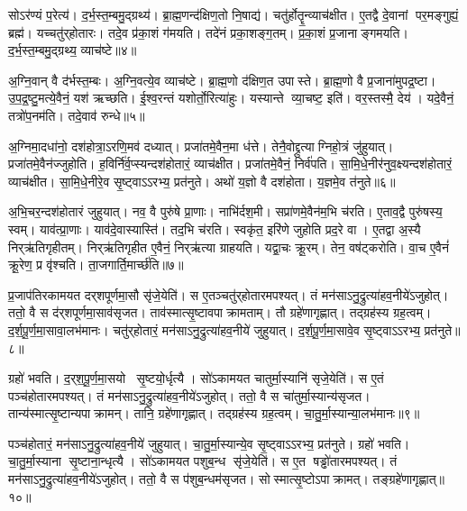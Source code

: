 सोऽर॑ण्यं प॒रेत्य॑।
द॒र्भ॒स्त॒म्बमु॒द्ग्रथ्य॑।
ब्रा॒ह्म॒णन्द॑क्षिण॒तो नि॒षाद्य॑।
चतु॑र्होतॄ॒न्व्याच॑क्षीत।
ए॒तद्वै दे॒वानां पर॒मङ्गुह्यं॒ ब्रह्म॑।
यच्चतु॑र्‌होतारः।
तदे॒व प्र॑का॒शं ग॑मयति।
तदे॑नं प्रका॒शङ्ग॒तम्।
प्र॒का॒शं प्र॒जानाङ्गमयति।
द॒र्भ॒स्त॒म्बमु॒द्ग्रथ्य॒ व्याच॑ष्टे॥४॥

अ॒ग्नि॒वान् वै द॑र्भस्त॒म्बः।
अ॒ग्नि॒वत्ये॒व व्याच॑ष्टे।
ब्रा॒ह्म॒णो द॑क्षिण॒त उपास्ते।
ब्रा॒ह्म॒णो वै प्र॒जाना॑मुपद्र॒ष्टा।
उ॒प॒द्र॒ष्टु॒मत्ये॒वैनं॒ यश॑ ऋच्छति।
ई॒श्व॒रन्तं यशोर्तो॒रित्या॑हुः।
यस्यान्ते व्या॒चष्ट॒ इति॑।
वर॒स्तस्मै॒ देय॑।
यदे॒वैनं॒ तत्रो॑प॒नम॑ति।
तदे॒वाव॑ रुन्धे॥५॥

अ॒ग्निमा॒दधा॑नो॒ दश॑होत्रा॒ऽरणि॒मव॑ दध्यात्।
प्रजा॑तमे॒वैन॒मा ध॑त्ते।
तेनै॒वोद्द्रुत्याग्निहो॒त्रं जु॑हुयात्।
प्रजा॑तमे॒वैन॑ज्जुहोति।
ह॒विर्नि॑र्व॒प्स्यन्दश॑होतारं॒ व्याच॑क्षीत।
प्रजा॑तमे॒वैनं॒ निर्व॑पति।
सा॒मि॒धे॒नीर॑नुव॒क्ष्यन्दश॑होतारं॒ व्याच॑क्षीत।
सा॒मि॒धे॒नीरे॒व सृ॒ष्ट्वाऽऽरभ्य॒ प्रत॑नुते।
अथो॑ य॒ज्ञो वै दश॑होता।
य॒ज्ञमे॒व त॑नुते॥६॥

अ॒भि॒चर॒न्दश॑होतारं जुहुयात्।
नव॒ वै पुरु॑षे प्रा॒णाः।
नाभि॑र्दश॒मी।
सप्रा॑णमे॒वैन॑म॒भि च॑रति।
ए॒ताव॒द्वै पुरु॑षस्य॒ स्वम्।
याव॑त्प्रा॒णाः।
याव॑दे॒वास्यास्ति॑।
तद॒भि च॑रति।
स्वकृ॑त॒ इरि॑णे जुहोति प्रद॒रे वा।
ए॒तद्वा अ॒स्यै निर्‌ऋ॑तिगृहीतम्।
निर्‌ऋ॑तिगृहीत ए॒वैनं॒ निर्‌ऋ॑त्या ग्राहयति।
यद्वा॒चः क्रू॒रम्।
तेन॒ वष॑ट्करोति।
वा॒च ए॒वैनं॑ क्रू॒रेण॒ प्र वृ॑श्चति।
ता॒जगार्ति॒मार्च्छ॑ति॥७॥\anuvakamend[दश॑होता॒ सृष्ट्या॑ ऋ॒च्छेद्व्याच॑प्टे रुन्ध ए॒व त॑नुते॒ निर्‌ऋ॑तिगृहीतं॒ पञ्च॑ च]

प्र॒जाप॑तिरकामयत दर्‌शपूर्णमा॒सौ सृ॑जे॒येति॑।
स ए॒तञ्चतु॑र्‌होतारमपश्यत्।
तं मन॑साऽनु॒द्रुत्या॑हव॒नीये॑ऽजुहोत्।
ततो॒ वै स द॑र्‌शपूर्णमा॒साव॑सृजत।
ताव॑स्मात्सृ॒ष्टावपाक्रामताम्।
तौ ग्रहे॑णागृह्णात्।
तद्ग्रह॑स्य ग्रह॒त्वम्।
द॒र्श॒पू॒र्ण॒मा॒सावा॒लभ॑मानः।
चतु॑र्‌होतारं॒ मन॑साऽनु॒द्रुत्या॑हव॒नीये॑ जुहुयात्।
द॒र्श॒पू॒र्ण॒मा॒सावे॒व सृ॒ष्ट्वाऽऽरभ्य॒ प्रत॑नुते॥८॥

ग्रहो॑ भवति।
द॒र्‌श॒पू॒र्ण॒मा॒सयो सृ॒ष्टयो॒र्धृत्यै।
सो॑ऽकामयत चातुर्मा॒स्यानि॑ सृजे॒येति॑।
स ए॒तं पञ्च॑होतारमपश्यत्।
तं मन॑साऽनु॒द्रुत्या॑हव॒नीये॑ऽजुहोत्।
ततो॒ वै स चा॑तुर्मा॒स्यान्य॑सृजत।
तान्य॑स्मात्सृ॒ष्टान्यपाक्रामन्।
तानि॒ ग्रहे॑णागृह्णात्।
तद्ग्रह॑स्य ग्रह॒त्वम्।
चा॒तु॒र्मा॒स्यान्या॒लभ॑मानः॥९॥

पञ्च॑होतारं॒ मन॑साऽनु॒द्रुत्या॑हव॒नीये॑ जुहुयात्।
चा॒तु॒र्मा॒स्यान्ये॒व सृ॒ष्ट्वाऽऽरभ्य॒ प्रत॑नुते।
ग्रहो॑ भवति।
चा॒तु॒र्मा॒स्याना सृ॒ष्टाना॒न्धृत्यै।
सो॑ऽकामयत पशुब॒न्ध सृ॑जे॒येति॑।
स ए॒त षड्ढो॑तारमपश्यत्।
तं मन॑साऽनु॒द्रुत्या॑हव॒नीये॑ऽजुहोत्।
ततो॒ वै स प॑शुब॒न्धम॑सृजत।
सोस्मात्सृ॒ष्टोऽपाक्रामत्।
तङ्ग्रहे॑णागृह्णात्॥१०॥

